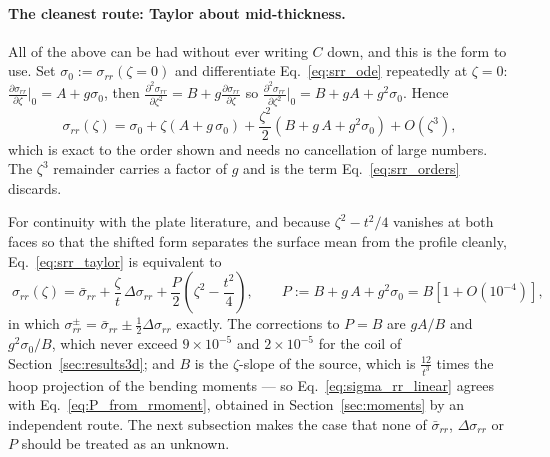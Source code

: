 \documentclass[11pt]{article}
\begin{document}
\paragraph{The cleanest route: Taylor about mid-thickness.} All of the above can
be had without ever writing $C$ down, and this is the form to use. Set
$\sigma_{0} := \sigma_{rr}\left(\zeta = 0\right)$ and differentiate
Eq.~\eqref{eq:srr_ode} repeatedly at $\zeta = 0$:
$\frac{\partial \sigma_{rr}}{\partial \zeta}\big|_{0} = A + g\sigma_{0}$, then
$\frac{\partial^{2} \sigma_{rr}}{\partial \zeta^{2}} = B
+ g\frac{\partial \sigma_{rr}}{\partial \zeta}$ so
$\frac{\partial^{2} \sigma_{rr}}{\partial \zeta^{2}}\big|_{0}
= B + gA + g^{2}\sigma_{0}$. Hence
\begin{equation}\label{eq:srr_taylor}
    \boxed{\;\sigma_{rr}\left(\zeta\right)
      = \sigma_{0}
      + \zeta\left(A + g\,\sigma_{0}\right)
      + \frac{\zeta^{2}}{2}\left(B + g\,A + g^{2}\sigma_{0}\right)
      + O\!\left(\zeta^{3}\right),\;}
\end{equation}
which is exact to the order shown and needs no cancellation of large numbers. The
$\zeta^{3}$ remainder carries a factor of $g$ and is the term
Eq.~\eqref{eq:srr_orders} discards.

For continuity with the plate literature, and because
$\zeta^{2}-t^{2}/4$ vanishes at both faces so that the shifted form separates the
surface mean from the profile cleanly, Eq.~\eqref{eq:srr_taylor} is equivalent to
\begin{equation}\label{eq:sigma_rr_linear}
    \boxed{\;\sigma_{rr}\left(\zeta\right)
      = \bar\sigma_{rr} + \frac{\zeta}{t}\,\Delta\sigma_{rr}
      + \frac{P}{2}\left(\zeta^{2}-\frac{t^{2}}{4}\right),
    \qquad P := B + g\,A + g^{2}\sigma_{0} = B\left[1+O\!\left(10^{-4}\right)\right],\;}
\end{equation}
in which $\sigma_{rr}^{\pm} = \bar\sigma_{rr} \pm \tfrac12\Delta\sigma_{rr}$
exactly. The corrections to $P = B$ are $gA/B$ and $g^{2}\sigma_{0}/B$, which
never exceed $9\times10^{-5}$ and $2\times10^{-5}$ for the coil of
Section~\ref{sec:results3d}; and $B$ is the $\zeta$-slope of the source, which is
$\frac{12}{t^{3}}$ times the hoop projection of the bending moments --- so
Eq.~\eqref{eq:sigma_rr_linear} agrees with Eq.~\eqref{eq:P_from_rmoment},
obtained in Section~\ref{sec:moments} by an independent route. The next
subsection makes the case that none of $\bar\sigma_{rr}$, $\Delta\sigma_{rr}$ or
$P$ should be treated as an unknown.
\end{document}
